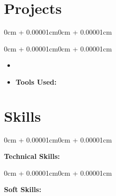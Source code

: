 \documentclass[10pt, letterpaper]{article}
\newenvironment{highlights}{
    \begin{itemize}[
        topsep=0.10cm,
        parsep=0.10cm,
        partopsep=0pt,
        itemsep=0pt,
        leftmargin=0cm + 10pt
    ]
}{
    \end{itemize}
}
\newenvironment{onecolentry}{
    \begin{adjustwidth}{0cm + 0.00001cm}{0cm + 0.00001cm}
}{
    \end{adjustwidth}
}
\newenvironment{twocolentry}[2][]{
    \onecolentry
    \def\secondColumn{#2}
    \setcolumnwidth{\fill, 4.5cm}
    \begin{paracol}{2}
}{
    \switchcolumn \raggedleft \secondColumn
    \end{paracol}
    \endonecolentry
}
\begin{document}
    \section{Projects}
        \begin{twocolentry}{}
            \textbf{}
        \end{twocolentry}
        \vspace{0.10cm}
        \begin{onecolentry}
            \begin{highlights}
                    \item {}
                \item \textbf{Tools Used:} 
            \end{highlights}
        \end{onecolentry}

    \section{Skills}
    \begin{onecolentry}
        \textbf{Technical Skills:} 
    \end{onecolentry}
    \vspace{0.2cm}
    \begin{onecolentry}
        \textbf{Soft Skills:} 
    \end{onecolentry}
\end{document}
